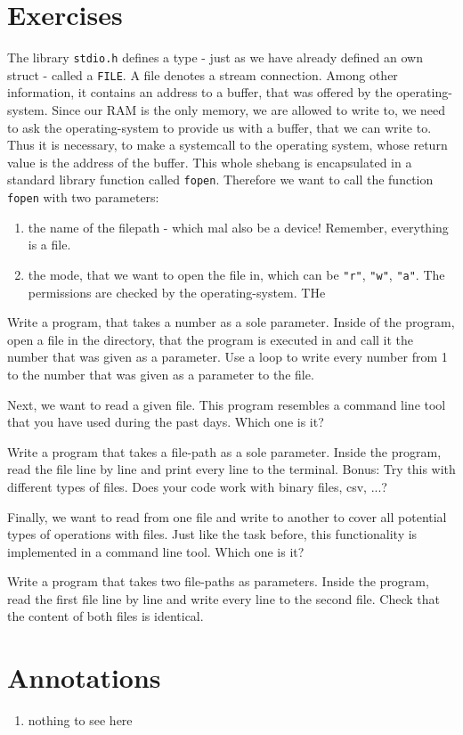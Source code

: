 \documentclass{dcbl/challenge}
\begin{document}
\section*{Exercises}
\begin{aufgabe}
    The library \texttt{stdio.h} defines a type - just as we have already defined an own struct - called a \texttt{FILE}.
    A file denotes a stream connection. 
    Among other information, it contains an address to a buffer, that was offered by the operating-system. 
    Since our RAM is the only memory, we are allowed to write to, we need to ask the operating-system to provide us with a buffer, that we can write to.
    Thus it is necessary, to make a systemcall to the operating system, whose return value is the address of the buffer.
    This whole shebang is encapsulated in a standard library function called \texttt{fopen}.
    Therefore we want to call the function \texttt{fopen} with two parameters:
    \begin{enumerate}
        \item the name of the filepath - which mal also be a device! Remember, everything is a file.
        \item the mode, that we want to open the file in, which can be \texttt{"r"}, \texttt{"w"}, \texttt{"a"}. The permissions are checked by the operating-system. THe 
    \end{enumerate}
\end{aufgabe}
\begin{aufgabe}
    Write a program, that takes a number as a sole parameter.
    Inside of the program, open a file in the directory, that the program is executed in and call it the number that was given as a parameter.
    Use a loop to write every number from 1 to the number that was given as a parameter to the file.
\end{aufgabe}

\begin{aufgabe}
    Next, we want to read a given file. This program resembles a command line tool that you have used during the past days. Which one is it?
    
    Write a program that takes a file-path as a sole parameter.
    Inside the program, read the file line by line and print every line to the terminal.
    Bonus: Try this with different types of files. Does your code work with binary files, csv, ...?
\end{aufgabe}

\begin{aufgabe}
    Finally, we want to read from one file and write to another to cover all potential types of operations with files. Just like the task before, this functionality is implemented in a command line tool. Which one is it?
    
    Write a program that takes two file-paths as parameters.
    Inside the program, read the first file line by line and write every line to the second file. Check that the content of both files is identical.
\end{aufgabe}


\section*{Annotations}
\begin{enumerate}
    \item nothing to see here
\end{enumerate}
\end{document}
